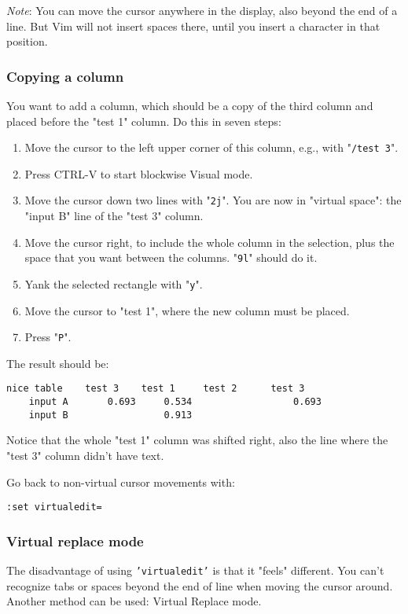 \emph{Note}: You can move the cursor anywhere in the display, also beyond the end of a line.
But Vim will not insert spaces there, until you insert a character in that position.

\subsubsection{Copying a column}
You want to add a column, which should be a copy of the third column and placed before the "test 1" column.
Do this in seven steps:

\begin{enumerate}
\item Move the cursor to the left upper corner of this column, e.g., with "\texttt{/test 3}".
\item Press CTRL-V to start blockwise Visual mode.
\item Move the cursor down two lines with "\texttt{2j}".  You are now in "virtual space": the "input B" line of the "test 3" column.
\item Move the cursor right, to include the whole column in the selection, plus the space that you want between the columns.  "\texttt{9l}" should do it.
\item Yank the selected rectangle with "\texttt{y}".
\item Move the cursor to "test 1", where the new column must be placed.
\item Press "\texttt{P}".
\end{enumerate}

The result should be:

\begin{Verbatim}[samepage=true]
    nice table    test 3    test 1     test 2      test 3 
    input A       0.693     0.534                  0.693 
    input B                 0.913 
\end{Verbatim}

Notice that the whole "test 1" column was shifted right, also the line where the "test 3" column didn't have text.

Go back to non-virtual cursor movements with:

\begin{Verbatim}[samepage=true]
 :set virtualedit=
\end{Verbatim}

\subsubsection{Virtual replace mode}
The disadvantage of using \texttt{'virtualedit'} is that it "feels" different.
You can't recognize tabs or spaces beyond the end of line when moving the cursor around.
Another method can be used: Virtual Replace mode.

